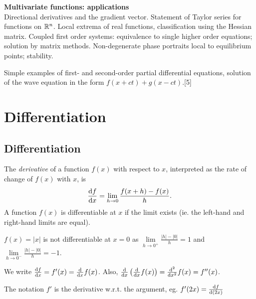 \documentclass[a4paper]{article}
\begin{document}
{  \vspace{10pt}
  \noindent\textbf{Multivariate functions: applications}\\
  Directional derivatives and the gradient vector. Statement of Taylor series for functions on $\mathbb{R}^n$. Local extrema of real functions, classification using the Hessian matrix. Coupled first order systems: equivalence to single higher order equations; solution by matrix methods. Non-degenerate phase portraits local to equilibrium points; stability.

  \vspace{5pt}
  \noindent Simple examples of first- and second-order partial differential equations, solution of the wave equation in the form $f(x + ct) + g(x - ct)$.\hspace*{\fill}[5]}
  \tableofcontents

  \section{Differentiation}
  \subsection{Differentiation}
  \begin{defi}
    The \emph{derivative} of a function $f(x)$ with respect to $x$, interpreted as the rate of change of $f(x)$ with $x$, is
    \[
      \frac{\mathrm{d} f}{\mathrm{d} x} = \lim_{h\to 0} \frac{f(x + h) - f(x)}{h}.
    \]
    A function $f(x)$ is differentiable at $x$ if the limit exists (ie. the left-hand and right-hand limits are equal).
  \end{defi}

  \begin{eg}
    $f(x)=|x|$ is not differentiable at $x = 0$ as $\lim\limits_{h\to 0^+} \frac{|h| - |0|}{h}= 1$ and $\lim\limits_{h\to 0^-} \frac{|h| - |0|}{h}= -1$.
  \end{eg}

  \begin{notation}
    We write $\frac{\mathrm{d} f}{\mathrm{d} x} = f'(x) = \frac{\mathrm{d}}{\mathrm{d} x} f(x)$. Also, $\frac{\mathrm{d}}{\mathrm{d} x}\left(\frac{\mathrm{d}}{\mathrm{d} x} f(x)\right) = \frac{\mathrm{d}^2}{\mathrm{d} x^2} f(x) = f''(x)$.

    \note The notation $f'$ is the derivative w.r.t. the argument, eg. $f'(2x) = \frac{\mathrm{d} f}{\mathrm{d} (2x)}$
  \end{notation}
\end{document}

